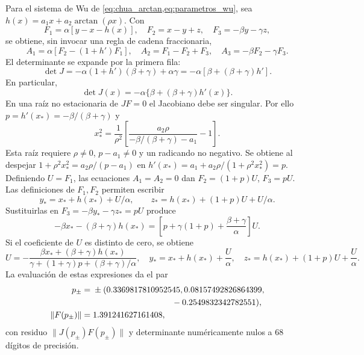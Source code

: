 Para el sistema de Wu de \cref{eq:chua_arctan,eq:parametros_wu}, sea
$h(x)=a_1x+a_2\arctan(\rho x)$. Con
\begin{equation}
 F_1=\alpha[y-x-h(x)],\quad F_2=x-y+z,\quad
 F_3=-\beta y-\gamma z,
\end{equation}
se obtiene, sin invocar una regla de cadena fraccionaria,
\begin{equation}
 A_1=\alpha[F_2-(1+h')F_1],\quad
 A_2=F_1-F_2+F_3,\quad A_3=-\beta F_2-\gamma F_3.
 \label{pilot:eq-wu-JF}
\end{equation}
El determinante se expande por la primera fila:
\[
 \det J=-\alpha(1+h')(\beta+\gamma)+\alpha\gamma
       =-\alpha[\beta+(\beta+\gamma)h'].
\]
En particular,
\begin{equation}
 \det J(x)=-\alpha\{\beta+(\beta+\gamma)h'(x)\}.
 \label{pilot:eq-wu-detJ}
\end{equation}
En una raíz no estacionaria de $JF=0$ el Jacobiano debe ser singular. Por ello
$p=h'(x_*)=-\beta/(\beta+\gamma)$ y
\begin{equation}
 x_*^2=\frac1{\rho^2}
 \left[
  \frac{a_2\rho}{-\beta/(\beta+\gamma)-a_1}-1
 \right].
 \label{pilot:eq-wu-xstar}
\end{equation}
Esta raíz requiere \(\rho\ne0\), \(p-a_1\ne0\) y un radicando no
negativo. Se obtiene al despejar
\(1+\rho^2x_*^2=a_2\rho/(p-a_1)\) en
\(h'(x_*)=a_1+a_2\rho/(1+\rho^2x_*^2)=p\).
Definiendo \(U=F_1\), las ecuaciones \(A_1=A_2=0\) dan
\(F_2=(1+p)U\), \(F_3=pU\). Las definiciones de \(F_1,F_2\) permiten
escribir
\[
 y_*=x_*+h(x_*)+U/\alpha,\qquad
 z_*=h(x_*)+(1+p)U+U/\alpha.
\]
Sustituirlas en \(F_3=-\beta y_*-\gamma z_*=pU\) produce
\[
 -\beta x_*-(\beta+\gamma)h(x_*)
 =\left[p+\gamma(1+p)+\frac{\beta+\gamma}{\alpha}\right]U.
\]
Si el coeficiente de \(U\) es distinto de cero, se obtiene
\begin{equation}
 U=-\frac{\beta x_*+(\beta+\gamma)h(x_*)}
 {\gamma+(1+\gamma)p+(\beta+\gamma)/\alpha},
 \quad
 y_*=x_*+h(x_*)+\frac U\alpha,
 \quad
 z_*=h(x_*)+(1+p)U+\frac U\alpha.
 \label{pilot:eq-wu-pp-solution}
\end{equation}
La evaluación de estas expresiones da el par
\begin{equation}
 \begin{aligned}
 p_\pm={}&\pm(0.3369817810952545,
 0.08157492826864399,\\
 &\hspace{3.3cm}-0.2549832342782551),\\
 \lVert F(p_\pm)\rVert={}&1.391241627161408,
 \end{aligned}
 \label{pilot:eq-wu-fppa-numeric}
\end{equation}
con residuo $\lVert J(p_\pm)F(p_\pm)\rVert$ y determinante numéricamente
nulos a 68 dígitos de precisión.

